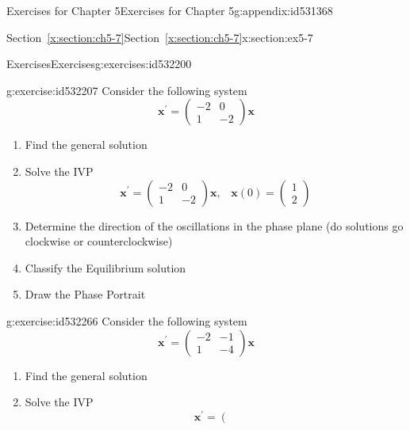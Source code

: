 \documentclass[oneside,10pt,]{book}
\newcommand{\xreffont}{\relax}
\numberwithin{equation}{section}
\numberwithin{equation}{section}
\newcommand{\amp}{&}
\begin{document}
\begin{appendixptx}{Exercises for Chapter 5}{}{Exercises for Chapter 5}{}{}{g:appendix:id531368}
\begin{sectionptx}{Section~{\xreffont\ref*{x:section:ch5-7}}}{}{Section~{\xreffont\ref*{x:section:ch5-7}}}{}{}{x:section:ex5-7}
\typeout{************************************************}
%
\begin{exercises-subsection-numberless}{Exercises}{}{Exercises}{}{}{g:exercises:id532200}
\begin{divisionexercise}{1}{}{}{g:exercise:id532207}%
Consider the following system%
\begin{equation*}
\mathbf{x}^{\prime}=\left(\begin{array}{cc}
-2 \amp 0\\
1 \amp -2
\end{array}\right)\mathbf{x}
\end{equation*}
%
%
\begin{enumerate}[label=(\alph*)]
\item{}Find the general solution%
\item{}Solve the IVP%
\begin{equation*}
\mathbf{x}^{\prime}=\left(\begin{array}{cc}
-2 \amp 0\\
1 \amp -2
\end{array}\right)\mathbf{x},\,\,\,\,\,\mathbf{x}(0)=\left(\begin{array}{c}
1\\
2
\end{array}\right)
\end{equation*}
%
\item{}Determine the direction of the oscillations in the phase plane (do solutions go clockwise or counterclockwise)%
\item{}Classify the Equilibrium solution%
\item{}Draw the Phase Portrait%
\end{enumerate}
\end{divisionexercise}%
\begin{divisionexercise}{2}{}{}{g:exercise:id532266}%
Consider the following system%
\begin{equation*}
\mathbf{x}^{\prime}=\left(\begin{array}{cc}
-2 \amp -1\\
1 \amp -4
\end{array}\right)\mathbf{x}
\end{equation*}
%
%
\begin{enumerate}[label=(\alph*)]
\item{}Find the general solution%
\item{}Solve the IVP%
\begin{equation*}
\mathbf{x}^{\prime}=\left(\begin{array}{cc}

\end{array}
\end{equation*}
\end{enumerate}
\end{divisionexercise}
\end{exercises-subsection-numberless}
\end{sectionptx}
\end{appendixptx}
\end{document}
